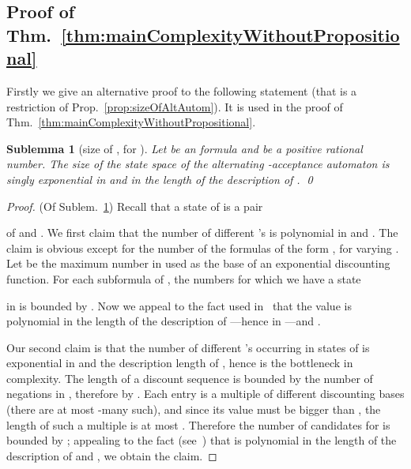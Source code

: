 \documentclass[a4paper,USenglish,numberwithinsect]{lipics}
\theoremstyle{definition}
\theoremstyle{remark}
\theoremstyle{plain}
\newtheorem{sublem}[defi]{Sublemma}
\begin{document}
\subsection{Proof of Thm.~\ref{thm:mainComplexityWithoutPropositional}}
Firstly we give an alternative proof to the following statement (that is
a restriction of Prop.~\ref{prop:sizeOfAltAutom}). It is used in the
proof of Thm.~\ref{thm:mainComplexityWithoutPropositional}.

\begin{sublem}[size of  , for ]\label{sublem:sizeOfAltAutomWithoutPropositional}
  Let  be an  formula and 
 be a positive rational number.  The size of the state space of
 the alternating -acceptance automaton
  is singly exponential in  and in the length of the description of . \qed
\end{sublem}
\begin{proof} (Of Sublem.~\ref{sublem:sizeOfAltAutomWithoutPropositional})
   Recall that a state of  is a pair
  
 of  and . 
 We first claim that the number of different 's is polynomial in 
  and . The claim is obvious
 except for the number of the formulas  of the form
 , for varying .
 Let
  be the maximum number 
in  
 used as the base of an exponential discounting function.
 For each subformula  of ,
 the numbers  for which we have a state
 
 in  is bounded by . Now we appeal to the fact used in~\cite{AlmagorBK14} that the value
  is
 polynomial in the length of the description of ---hence in 
 ---and
 .





 Our second claim is that the number of different 's occurring
 in states of   is exponential in
  and the description length of 
 , hence is the bottleneck in complexity. The length of a discount sequence  
 is bounded by the number of negations in , therefore by
  . Each entry  is a multiple
  of 
 different discounting bases  (there are 
 at most   -many such), and since its value 
 must be bigger than ,  the length  of such a multiple is at most
 . Therefore
 the number of candidates for  is bounded by
 ; appealing to
 the fact (see~\cite{AlmagorBK14}) that  is
 polynomial in the length of the description of  and
 , we obtain the claim.
\end{proof}
\end{document}
